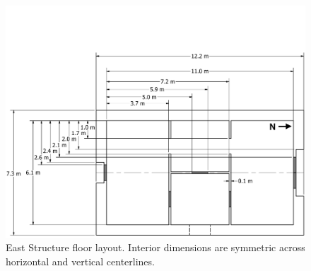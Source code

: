 \documentclass[12pt,oneside]{book}
\begin{document}
\begin{figure}[!ht]
	\includegraphics[width=\columnwidth]{../Figures/Floor_Plans/East_Test_Structure_Dimensioned_Full}
	\caption[Dimensioned floor plan of the East Structure.]{East Structure floor layout. Interior dimensions are symmetric across horizontal and vertical centerlines.}
	\label{fig:east_dimensioned_plan}
\end{figure}
\end{document}
